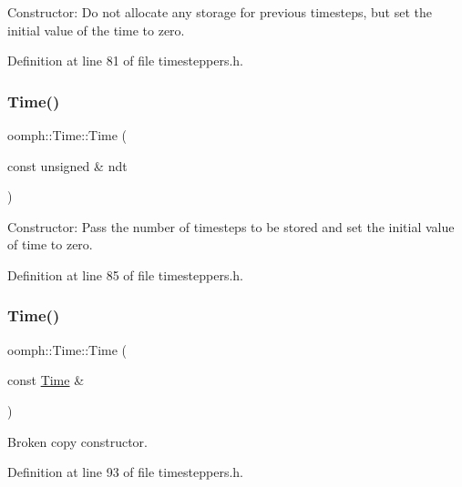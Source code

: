 Constructor\+: Do not allocate any storage for previous timesteps, but set the initial value of the time to zero. 



Definition at line 81 of file timesteppers.\+h.

\mbox{\label{classoomph_1_1Time_af933eb465690f9630983aa0fe24782a3}} 
\subsubsection{\texorpdfstring{Time()}{Time()}\hspace{0.1cm}{\footnotesize\ttfamily [2/3]}}
{\footnotesize\ttfamily oomph\+::\+Time\+::\+Time (\begin{DoxyParamCaption}\item[{const unsigned \&}]{ndt }\end{DoxyParamCaption})\hspace{0.3cm}{\ttfamily [inline]}}



Constructor\+: Pass the number of timesteps to be stored and set the initial value of time to zero. 



Definition at line 85 of file timesteppers.\+h.

\mbox{\label{classoomph_1_1Time_a8fbf9712b8ac81929a4be2ed4c1bcdbd}} 
\subsubsection{\texorpdfstring{Time()}{Time()}\hspace{0.1cm}{\footnotesize\ttfamily [3/3]}}
{\footnotesize\ttfamily oomph\+::\+Time\+::\+Time (\begin{DoxyParamCaption}\item[{const \hyperlink{classoomph_1_1Time}{Time} \&}]{ }\end{DoxyParamCaption})\hspace{0.3cm}{\ttfamily [inline]}}



Broken copy constructor. 



Definition at line 93 of file timesteppers.\+h.



